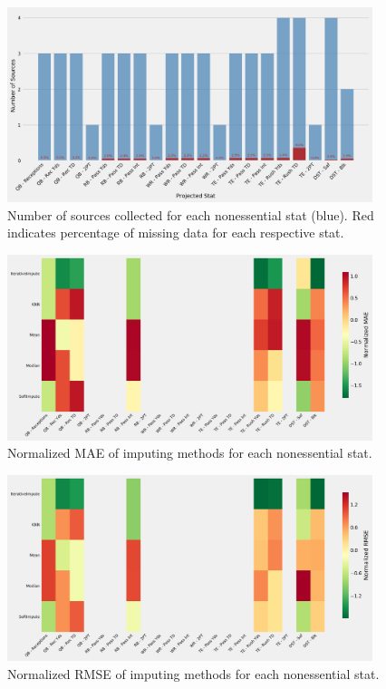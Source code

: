 \documentclass[12pt]{article}
\begin{document}
\begin{figure}[H]
  \centering
  \includegraphics[width=0.95\textwidth]{../figures/nonessential_missing_data}
  \caption{Number of sources collected for each nonessential stat (blue). Red  indicates percentage of missing data for each respective stat.}
\end{figure}

\begin{figure}[H]
  \centering
  \includegraphics[width=0.95\textwidth]{../figures/nonessential_impute_MAE}
  \caption{Normalized MAE of imputing methods for each nonessential stat.}
\end{figure}

\begin{figure}[H]
  \centering
  \includegraphics[width=0.95\textwidth]{../figures/nonessential_impute_RMSE}
  \caption{Normalized RMSE of imputing methods for each nonessential stat.}
\end{figure}
\end{document}
